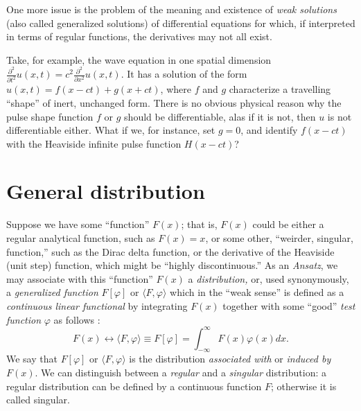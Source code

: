 One more issue is the problem of the meaning and existence of
{\em weak solutions} (also called   generalized solutions)
of differential equations  for which, if interpreted in terms of regular functions,
the derivatives may not all exist.

{
\color{blue}
\bexample
Take, for example, the wave equation in one spatial dimension
$
\frac{\partial^2 }{\partial t^2} u(x,t)
=c^2
\frac{\partial^2 }{\partial x^2} u(x,t)
.
$
It has a  solution of the form \cite{Barut1990349} $ u(x,t)= f(x-ct) + g(x+ct)$,
where $f$ and $g$ characterize  a travelling ``shape'' of inert, unchanged form.
There is no obvious physical reason why the pulse shape function $f$ or $g$ should be differentiable,
alas if it is not, then $u$ is not differentiable either.
What if we, for instance, set $g=0$, and identify $f(x-ct)$ with the Heaviside infinite pulse function $H(x-ct)$?

\eexample
}


\section{General distribution}

Suppose we have some ``function'' $F(x)$; that is, $F(x)$ could be either
a regular analytical function, such as $F(x)=x$,
or some other, ``weirder, singular, function,'' such as the Dirac delta function,
or the derivative of the Heaviside (unit step) function, which might be ``highly discontinuous.''
As an {\it Ansatz},  we may associate with this ``function'' $F(x)$
a
{\em distribution,}
or, used synonymously,
a
{\em generalized function}
$F[\varphi ]$
or $\langle F , \varphi \rangle $
which
in the ``weak sense'' is  defined as a {\em continuous linear functional}
by integrating $F(x)$ together with some ``good'' {\em test function} $\varphi$
as follows \cite{schwartz}:
\begin{equation}
 F(x) \longleftrightarrow \langle F , \varphi \rangle \equiv F[\varphi] =\int_{-\infty}^{\infty} F(x) \varphi (x) dx.
\end{equation}
We say that $F[\varphi ]$ or $\langle F , \varphi \rangle $ is the distribution {\em associated with}
or {\em induced by}
$F(x)$.
We can distinguish between a
{\em regular}
and a
{\em singular}
distribution:
a regular distribution can be defined by a continuous function $F$; otherwise it is called singular.


